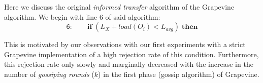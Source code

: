 Here we discuss the original \emph{informed transfer} algorithm of the
\textsf{Grapevine} algorithm. We begin with line 6 of said algorithm:
\[
\mathtt{6:} \qquad \mathrm{\mathbf{if}} \; (L_X + load(O_i) < L_{avg})
\; \mathrm{\mathbf{then}}
\]

This is motivated by our observations with our first experiments with
a strict \textsf{Grapevine} implementation of a high rejection rate of
this condition. Furthermore, this rejection rate only slowly and
marginally decreased with the increase in the number of
\emph{gossiping rounds} ($k$) in the first phase (gossip algorithm) of
\textsf{Grapevine}. 



